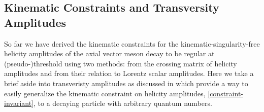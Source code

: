 \subsection{Kinematic Constraints and Transversity Amplitudes} \label{sec:transversity}
So far we have derived the kinematic constraints for the kinematic-singularity-free helicity amplitudes of the axial vector meson decay to be regular at (pseudo-)threshold using two methods: from the crossing matrix of helicity amplitudes and from their relation to Lorentz scalar amplitudes. Here we take a brief aside into transveristy amplitudes as discussed in \cite{Kotanski1968,Cohen-Tannoudji1968,McKerrell1968} which provide a way to easily generalize the kinematic constraint on helicity amplitudes, \cref{constraint-invariant}, to a decaying particle with arbitrary quantum numbers.

